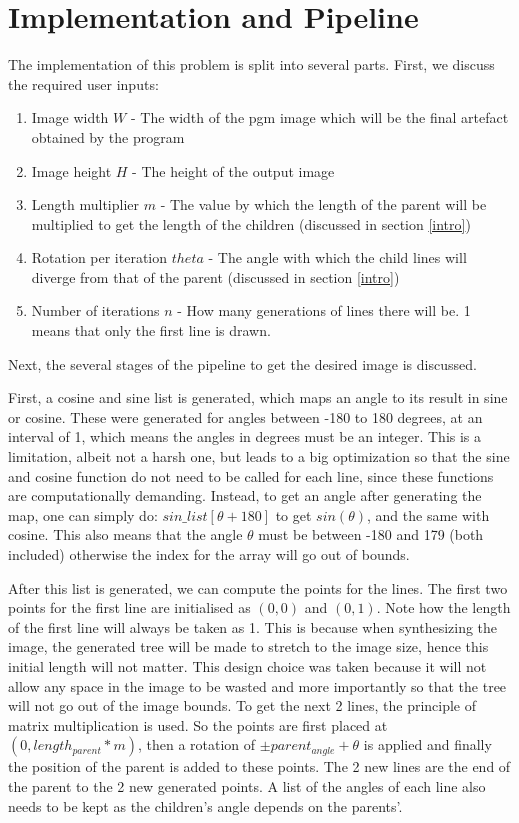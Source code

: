 \section{Implementation and Pipeline}
The implementation of this problem is split into several parts. First, we discuss the required user inputs:
\begin{enumerate}
	\item Image width $W$ - The width of the pgm image which will be the final artefact obtained by the program
	\item Image height $H$ - The height of the output image
	\item Length multiplier $m$ - The value by which the length of the parent will be multiplied to get the length of the children (discussed in section \ref{intro})
	\item Rotation per iteration $theta$ - The angle with which the child lines will diverge from that of the parent (discussed in section \ref{intro})
	\item Number of iterations $n$ - How many generations of lines there will be. 1 means that only the first line is drawn.
\end{enumerate}
Next, the several stages of the pipeline to get the desired image is discussed.

First, a cosine and sine list is generated, which maps an angle to its result in sine or cosine. These were generated for angles between -180 to 180 degrees, at an interval of 1, which means the angles in degrees must be an integer. This is a limitation, albeit not a harsh one, but leads to a big optimization so that the sine and cosine function do not need to be called for each line, since these functions are computationally demanding. Instead, to get an angle after generating the map, one can simply do: $sin\_list[\theta + 180]$ to get $sin(\theta)$, and the same with cosine. This also means that the angle $\theta$ must be between -180 and 179 (both included) otherwise the index for the array will go out of bounds.

After this list is generated, we can compute the points for the lines. The first two points for the first line are initialised as $(0, 0)$ and $(0, 1)$. Note how the length of the first line will always be taken as 1. This is because when synthesizing the image, the generated tree will be made to stretch to the image size, hence this initial length will not matter. This design choice was taken because it will not allow any space in the image to be wasted and more importantly so that the tree will not go out of the image bounds. To get the next 2 lines, the principle of matrix multiplication is used. So the points are first placed at $(0, length_{parent} * m)$, then a rotation of $\pm parent_{angle} + \theta$ is applied and finally the position of the parent is added to these points. The 2 new lines are the end of the parent to the 2 new generated points. A list of the angles of each line also needs to be kept as the children's angle depends on the parents'.

